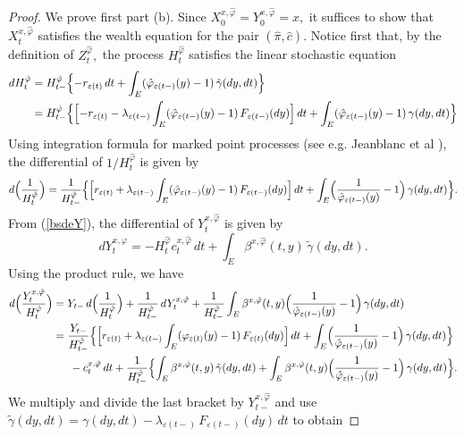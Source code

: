 \documentclass[11pt]{article}
\theoremstyle{plain}
\theoremstyle{definition}
\numberwithin{equation}{section}
\newcommand{\eps}{\varepsilon}
\begin{document}
\begin{proof}
We prove first part (b). Since $X_0^{x,\hat{\varphi}}=Y_0^{x,\hat{\varphi}}=x,$ it suffices to show that $X_t^{x,\hat{\varphi}}$ satisfies the wealth equation for the pair $(\hat{\pi},\hat{c}).$ Notice first that, by the definition of $Z_t^{\hat{\varphi}},$ the process $H_t^{\hat{\varphi}}$ satisfies the linear stochastic equation
\begin{align*}
  dH^{\hat{\varphi}}_t&=H^{\hat{\varphi}}_{t-}\Bigl\{-r_{\eps(t)}\,dt+\int_E(\hat{\varphi}_{\eps(t-)}(y)-1)\,\tilde{\gamma}(dy,dt)\Bigr\}\\
          &=H^{\hat{\varphi}}_{t-}\Bigl\{\Bigl[-r_{\eps(t)}-\lambda_{\eps(t-)}\int_E(\hat{\varphi}_{\eps(t-)}(y)-1)\,F_{\eps(t-)}(dy)\Bigr]\,dt
          +\int_E(\hat{\varphi}_{\eps(t-)}(y)-1)\,\gamma(dy,dt)\Bigr\}
\end{align*}
Using integration formula for marked point processes (see e.g. Jeanblanc et al \cite[Section 8.8]{jeanblanc}), the differential of $1/H^{\hat{\varphi}}_t$ is given by
\[
  d\Bigl(\frac{1}{H^{\hat{\varphi}}_t}\Bigr)
  =\frac{1}{H^{\hat{\varphi}}_{t-}}\Bigl\{\Bigl[r_{\eps(t)}+\lambda_{\eps(t-)}\int_E(\hat{\varphi}_{\eps(t-)}(y)-1)\,F_{\eps(t-)}(dy)\Bigr]\,dt
  +\int_E\Bigl(\frac{1}{\hat{\varphi}_{\eps(t-)}(y)}-1\Bigr)\,\gamma(dy,dt)\Bigr\}.
\]
From (\ref{bsdeY}), the differential of $Y^{x,\hat{\varphi}}_t$ is given by
\[
dY^{x,\hat{\varphi}}_t=-H^{\hat{\varphi}}_tc^{x,\hat{\varphi}}_t\,dt+\int_E\beta^{x,\hat{\varphi}}(t,y)\,\tilde{\gamma}(dy,dt).
\]
Using the product rule, we have
\begin{align*}
  d\Bigl(\frac{Y^{x,\hat{\varphi}}_t}{H^{\hat{\varphi}}_t}\Bigr)
  &=Y_{t-}\,d\Bigl(\frac{1}{H^{\hat{\varphi}}_t}\Bigr)+\frac{1}{H^{\hat{\varphi}}_{t-}}\,dY^{x,\hat{\varphi}}_t
  +\frac{1}{H^{\hat{\varphi}}_{t-}}\int_E\beta^{x,\hat{\varphi}}(t,y)\Bigl(\frac{1}{\hat{\varphi}_{\eps(t-)}(y)}-1\Bigr)\,\gamma(dy,dt)\\
  &=\frac{Y_{t-}}{H^{\hat{\varphi}}_{t-}}\Bigl\{\Bigl[r_{\eps(t)}+\lambda_{\eps(t-)}\int_E(\varphi_{\eps(t)}(y)-1)\,F_{\eps(t)}(dy)\Bigr]\,dt
  +\int_E\Bigl(\frac{1}{\hat{\varphi}_{\eps(t-)}(y)}-1\Bigr)\,\gamma(dy,dt)\Bigr\}\\
  &\phantom{==}-c^{x,\hat{\varphi}}_t\,dt+\frac{1}{H^{\hat{\varphi}}_{t-}}\Bigl\{\int_E\beta^{x,\hat{\varphi}}(t,y)\,\tilde{\gamma}(dy,dt)
  +\int_E\beta^{x,\hat{\varphi}}(t,y)\Bigl(\frac{1}{\hat{\varphi}_{\eps(t-)}(y)}-1\Bigr)\,\gamma(dy,dt)\Bigr\}.
\end{align*}
We multiply and divide the last bracket by $Y_{t-}^{x,\hat{\varphi}}$ and use $\tilde{\gamma}(dy,dt)=\gamma(dy,dt)-\lambda_{\eps(t-)}\,F_{\eps(t-)}(dy)\,dt$ to obtain

\end{proof}
\end{document}
